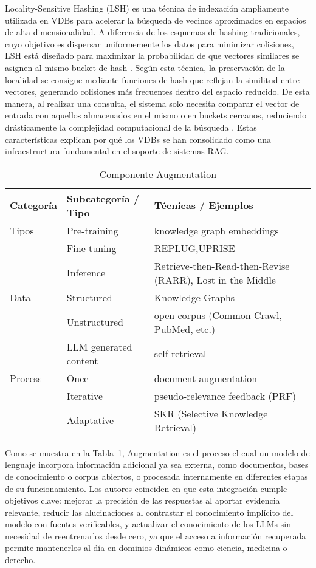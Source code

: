 Locality-Sensitive Hashing (LSH) es una técnica de indexación ampliamente utilizada en VDBs para acelerar la búsqueda de vecinos aproximados en espacios de alta 
dimensionalidad. A diferencia de los esquemas de hashing tradicionales, cuyo objetivo es dispersar uniformemente los datos para minimizar colisiones, LSH está diseñado 
para maximizar la probabilidad de que vectores similares se asignen al mismo bucket de hash \parencite{ma2025vector}. Según esta técnica, la preservación de la localidad 
se consigue mediante funciones de hash que reflejan la similitud entre vectores, generando colisiones más frecuentes dentro del espacio reducido. De esta manera, al realizar una 
consulta, el sistema solo necesita comparar el vector de entrada con aquellos almacenados en el mismo o en buckets cercanos, reduciendo drásticamente la complejidad 
computacional de la búsqueda \parencite{ma2025vector}. Estas características explican por qué los VDBs se han consolidado como una infraestructura fundamental en el soporte
de sistemas RAG.


\begin{table}[H]
\centering
\begin{tabularx}{\textwidth}{l l >{\raggedright\arraybackslash}X}
\toprule
\textbf{Categoría} & \textbf{Subcategoría / Tipo} & \textbf{Técnicas / Ejemplos} \\
\midrule
Tipos   & Pre-training          & knowledge graph embeddings \\
        & Fine-tuning           & REPLUG,UPRISE \\
        & Inference             & Retrieve-then-Read-then-Revise (RARR), Lost in the Middle  \\
\midrule
Data    & Structured            & Knowledge Graphs \\
        & Unstructured          & open corpus (Common Crawl, PubMed, etc.) \\
        & LLM generated content & self-retrieval \\
\midrule
Process & Once                  & document augmentation \\
        & Iterative             & pseudo-relevance feedback (PRF) \\
        & Adaptative            & SKR (Selective Knowledge Retrieval)\\
\bottomrule
\end{tabularx}
\caption{Componente Augmentation}
\label{tab:augmentation}
\end{table}
Como se muestra en la Tabla~\ref{tab:augmentation}, Augmentation es el proceso el cual un modelo de lenguaje incorpora información adicional 
ya sea externa, como documentos, bases de conocimiento o corpus abiertos, o procesada internamente en diferentes etapas de su funcionamiento.
Los autores coinciden en que esta integración cumple objetivos clave: mejorar la precisión de las respuestas al aportar evidencia relevante, 
reducir las alucinaciones al contrastar el conocimiento implícito del modelo con fuentes verificables, y actualizar el conocimiento de los LLMs sin 
necesidad de reentrenarlos desde cero, ya que el acceso a información recuperada permite mantenerlos al día en dominios dinámicos como ciencia, medicina o derecho.


